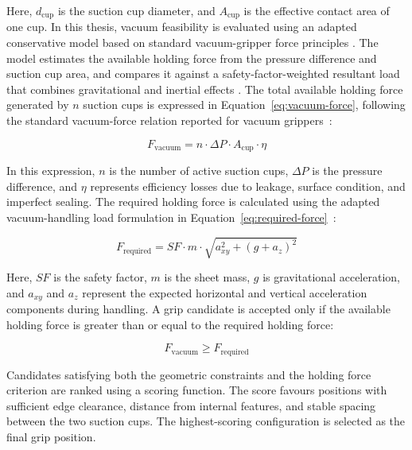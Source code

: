 Here, $d_{\text{cup}}$ is the suction cup diameter, and $A_{\text{cup}}$ is the effective contact area of one cup. In this thesis, vacuum feasibility is evaluated using an adapted conservative model based on standard vacuum-gripper force principles \cite{vacuum_handling_standard}. The model estimates the available holding force from the pressure difference and suction cup area, and compares it against a safety-factor-weighted resultant load that combines gravitational and inertial effects \cite{VacuumGripperModeling}. The total available holding force generated by $n$ suction cups is expressed in Equation~\ref{eq:vacuum-force}, following the standard vacuum-force relation reported for vacuum grippers~\cite{VacuumGripperModeling}:

\begin{equation}
F_{\text{vacuum}} = n \cdot \Delta P \cdot A_{\text{cup}} \cdot \eta
\label{eq:vacuum-force}
\end{equation}

In this expression, $n$ is the number of active suction cups, $\Delta P$ is the pressure difference, and $\eta$ represents efficiency losses due to leakage, surface condition, and imperfect sealing. The required holding force is calculated using the adapted vacuum-handling load formulation in Equation~\ref{eq:required-force}~\cite{vacuum_handling_standard}:

\begin{equation}
F_{\text{required}} = SF \cdot m \cdot \sqrt{a_{xy}^2 + (g + a_z)^2}
\label{eq:required-force}
\end{equation}

Here, $SF$ is the safety factor, $m$ is the sheet mass, $g$ is gravitational acceleration, and $a_{xy}$ and $a_z$ represent the expected horizontal and vertical acceleration components during handling. A grip candidate is accepted only if the available holding force is greater than or equal to the required holding force:

\begin{equation}
F_{\text{vacuum}} \geq F_{\text{required}}
\label{eq:vacuum-feasibility-criterion}
\end{equation}

Candidates satisfying both the geometric constraints and the holding force criterion are ranked using a scoring function. The score favours positions with sufficient edge clearance, distance from internal features, and stable spacing between the two suction cups. The highest-scoring configuration is selected as the final grip position.

